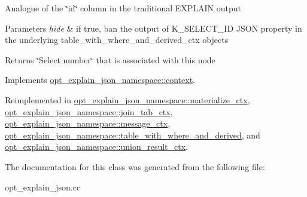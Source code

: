 Analogue of the \char`\"{}id\char`\"{} column in the traditional E\+X\+P\+L\+A\+IN output


\begin{DoxyParams}{Parameters}
{\em hide} & if true, ban the output of K\+\_\+\+S\+E\+L\+E\+C\+T\+\_\+\+ID J\+S\+ON property in the underlying table\+\_\+with\+\_\+where\+\_\+and\+\_\+derived\+\_\+ctx objects\\
\hline
\end{DoxyParams}
\begin{DoxyReturn}{Returns}
\char`\"{}\+Select number\char`\"{} that is associated with this node 
\end{DoxyReturn}


Implements \mbox{\hyperlink{classopt__explain__json__namespace_1_1context_a07c46bab31a35d88c13ccdca82755aaa}{opt\+\_\+explain\+\_\+json\+\_\+namespace\+::context}}.



Reimplemented in \mbox{\hyperlink{classopt__explain__json__namespace_1_1materialize__ctx_ae1e9e31aa9072cf01733c417a1821773}{opt\+\_\+explain\+\_\+json\+\_\+namespace\+::materialize\+\_\+ctx}}, \mbox{\hyperlink{classopt__explain__json__namespace_1_1join__tab__ctx_a294e12d9416adb645ab30841bddda4e0}{opt\+\_\+explain\+\_\+json\+\_\+namespace\+::join\+\_\+tab\+\_\+ctx}}, \mbox{\hyperlink{classopt__explain__json__namespace_1_1message__ctx_a76f2d4b59c3707aa67afef272d4a00ca}{opt\+\_\+explain\+\_\+json\+\_\+namespace\+::message\+\_\+ctx}}, \mbox{\hyperlink{classopt__explain__json__namespace_1_1table__with__where__and__derived_ab71bf926210b34494e172ff100cc348b}{opt\+\_\+explain\+\_\+json\+\_\+namespace\+::table\+\_\+with\+\_\+where\+\_\+and\+\_\+derived}}, and \mbox{\hyperlink{classopt__explain__json__namespace_1_1union__result__ctx_af03161b8ce22f7a3e95489dd1be62118}{opt\+\_\+explain\+\_\+json\+\_\+namespace\+::union\+\_\+result\+\_\+ctx}}.



The documentation for this class was generated from the following file\+:\begin{DoxyCompactItemize}
\item 
opt\+\_\+explain\+\_\+json.\+cc\end{DoxyCompactItemize}
